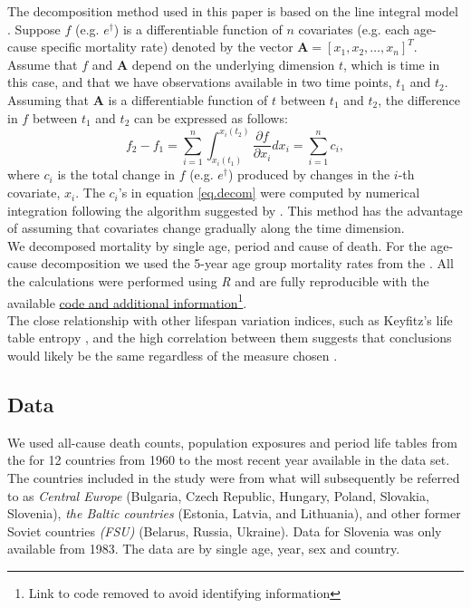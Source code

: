 \documentclass{article}
\newcommand{\vect}[1]{\boldsymbol{#1}}
\begin{document}
\begin{spacing}{1.5}
The decomposition method used in this paper is based on the line integral model \citep{horiuchi2008}. Suppose $f$ (e.g. $e^\dagger$) is a differentiable function of $n$ covariates (e.g. each age-cause specific mortality rate) denoted by the vector $\vect{A} = \left[x_1,x_2,\ldots,x_n \right]^T$. Assume that $f$ and $\vect{A}$ depend on the underlying dimension $t$, which is time in this case, and that we have observations available in two time points, $t_1$ and $t_2$. Assuming that $\vect{A}$ is a differentiable function of $t$ between $t_1$ and $t_2$, the difference in $f$ between $t_1$ and $t_2$ can be expressed as follows:
\begin{equation}
\label{eq.decom}
f_2-f_1 = \sum_{i = 1}^n \int_{x_i(t_1)}^{x_i(t_2)}\frac{\partial f}{\partial x_i}dx_i=\sum_{i = 1}^nc_i ,
\end{equation}
where $c_i$ is the total change in $f$ (e.g. $e^\dagger$) produced by changes in the $i$-th covariate, $x_i$. The $c_i$'s in equation \eqref{eq.decom} were computed by numerical integration following the algorithm suggested by \citet{horiuchi2008}. This method has the advantage of assuming that covariates change gradually along the time dimension.\\

We decomposed mortality by single age, period and cause of death. For the age-cause decomposition we used the 5-year age group mortality rates from the \cite{HcO}. All the calculations were performed using \textit{R} \citep{team2000r} and are fully reproducible with the available \href{}{code and additional information}\footnote{Link to code removed to avoid identifying information}.\\

The close relationship with other lifespan variation indices, such as Keyfitz's life table entropy \citep{vaupel&Canudas2003}, and the high correlation between them suggests that conclusions would likely be the same regardless of the measure chosen \citep{vanraalte2013,vaupel2011,wilmoth1999}.\\


\subsection*{Data}
We used all-cause death counts, population exposures and period life tables from the \citet{HMD} for 12 countries from 1960 to the most recent year available in the data set. The countries included in the study were from what will subsequently be referred to as \textit{Central Europe} (Bulgaria, Czech Republic, Hungary, Poland, Slovakia, Slovenia), \textit{the Baltic countries} (Estonia, Latvia, and Lithuania), and other former Soviet countries \textit{(FSU)} (Belarus, Russia, Ukraine). Data for Slovenia was only available from 1983. The data are by single age, year, sex and country.\\


\end{spacing}
\end{document}
